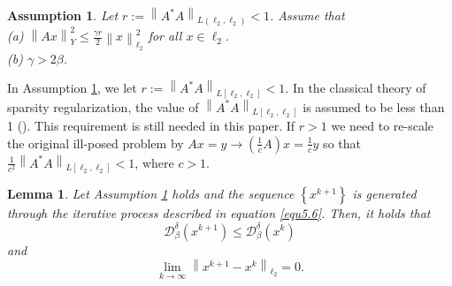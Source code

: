 \documentclass[a4paper,12pt]{article}
\newtheorem{lemma}[theorem]{Lemma}
\newtheorem{assumption}[theorem]{Assumption}
\numberwithin{equation}{section}
\begin{document}
\begin{assumption}\label{ass5.6}
    Let $r:=\left\|A^{*}A\right\|_{L(\ell_{2},\ell_{2})}<1$. Assume that\\
    (a) $\left\|Ax\right\|_{Y}^{2}\leq\frac{\gamma r}{2}\left\|x\right\|_{\ell_{2}}^{2}$ for all $x\in\ell_{2}$.\\
    (b) $\gamma> 2\beta$.
\end{assumption}

\par In Assumption \ref{ass5.6}, we let $r:=\left\|A^{*}A\right\|_{L[\ell_{2},\ell_{2}]}<1$. In the classical theory of sparsity regularization, the value of $\left\|A^{*}A\right\|_{L[\ell_{2},\ell_{2}]}$ is assumed to be less than 1 (\cite{DDD04}). This requirement is still needed in this paper. If $r>1$ we need to re-scale the original ill-posed problem by $Ax=y \rightarrow \left(\frac{1}{c}A\right)x=\frac{1}{c}y$ so that $\frac{1}{c^{2}}\left\|A^{*}A\right\|_{L[\ell_{2},\ell_{2}]}<1$, where $c>1$.

\begin{lemma}\label{lem5.7}
    Let Assumption \ref{ass5.6} holds and the sequence $\left\{x^{k+1}\right\}$ is generated through the iterative process described in equation \eqref{equ5.6}. Then, it holds that
    \begin{equation*}
        \mathcal{D}_{\beta}^{\delta}\left(x^{k+1}\right)\leq \mathcal{D}_{\beta}^{\delta}\left(x^{k}\right)
    \end{equation*}
    and
    \begin{equation*}
        \lim_{k\rightarrow\infty}\left\|x^{k+1}-x^{k}\right\|_{\ell_{2}}=0.
    \end{equation*}
\end{lemma}
\end{document}
